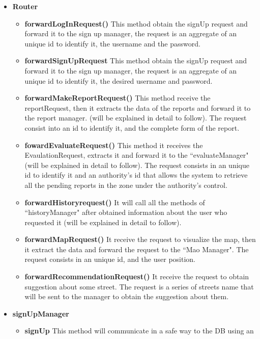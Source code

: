 \documentclass[12pt,a4paper]{report}
\begin{document}
					\begin{itemize}
						\item \textbf{Router}
						\begin{itemize}
							\item \textbf{forwardLogInRequest()} This method obtain the signUp request and
								forward it to the sign up manager, the request is an aggregate of an unique id to
								identify it, the username and the password.
							\item \textbf{forwardSignUpRequest} This method obtain the signUp request and forward 
								it to the sign up manager, the request is an aggregate of an unique id to identify it,
								the desired username and password.
							\item \textbf{forwardMakeReportRequest()} This method receive the reportRequest,
								then it extracts the data of the reports and forward it to the report manager.
								(will be explained in detail to follow).  The request consist into an id to identify it,
								and the complete form of the report.
							\item \textbf{fowardEvaluateRequest()} This method it receives the EvaulationRequest,
								extracts it and forward it to the ``evaluateManager"
								(will be explained in detail to follow). The request consists in an unique id to identify
								it and an authority's id that allows the system to retrieve all the pending reports
								in the zone under the authority's control.
							\item \textbf{forwardHistoryrequest()} It will call all the methods of
								``historyManager" after obtained information about the user who requested it (will
								be explained in detail to follow).
							\item \textbf{forwardMapRequest()} It receive the request to visualize the map, then it
								extract the data and forward the request to the ``Mao Manager". The request
								consists in an unique id, and the user position.
							\item \textbf{forwardRecommendationRequest()} It receive the request to obtain
								suggestion about some street. The request is a series of streets name that will be
								sent to the manager to obtain the suggestion about them.
						\end{itemize}
						\item \textbf{signUpManager}
						\begin{itemize}
							\item \textbf{signUp} This method will communicate in a safe way to the DB using an

\end{itemize}
\end{itemize}
\end{document}
